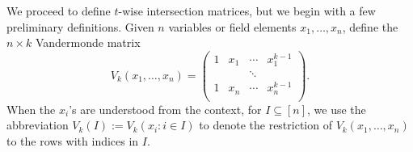 \documentclass[11pt]{article}
\begin{document}
We proceed to define $t$-wise intersection matrices, but we begin with a few preliminary definitions.
Given  $n$  variables or field elements $x_1,\ldots,x_n$, define the  $n\times k$ Vandermonde matrix
\begin{equation}\label{vandermonde}
V_k(x_1,\ldots,x_n)=\left(
    \begin{array}{cccc}
      1  & x_{1} & \cdots & x_{1}^{k-1} \\
       &  & \ddots &  \\
      1  & x_{n} & \cdots & x_{n}^{k-1} \\
    \end{array}
  \right).
\end{equation}
When the $x_i$'s are understood from the context, for $I\subseteq [n]$, we use the abbreviation $V_k(I):=V_k(x_i:i\in I)$ to denote the restriction of $V_k(x_1,\ldots,x_n)$ to the rows with indices in $I$.
\end{document}
